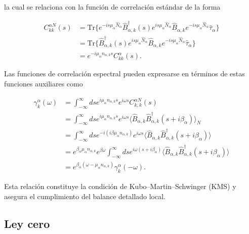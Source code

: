 \begin{appendixs}
la cual se relaciona con la función de correlación estándar de la forma

\begin{align*}
    C^{\alpha N}_{kk}(s) & = \text{Tr}\{e^{-is\mu_{\alpha}\hat{N}_{\alpha} }\hat{B}^{\dagger}_{\alpha,k}(s)e^{is\mu_{\alpha}\hat{N}_{\alpha}} \hat{B}_{\alpha,k}e^{-is\mu_{\alpha}\hat{N}_{\alpha} }\hat{\tau}_{\alpha}   \} \\
 & = \text{Tr}\{\hat{B}^{\dagger}_{\alpha,k}(s)e^{is\mu_{\alpha}\hat{N}_{\alpha}} \hat{B}_{\alpha,k}e^{-is\mu_{\alpha}\hat{N}_{\alpha}}\hat{\tau}_{\alpha}   \}\\
 & = e^{-i\mu_{\alpha}n_{\alpha,k}s} C^{\alpha}_{kk}(s).
\end{align*}

Las funciones de correlación espectral pueden expresarse en términos de estas funciones auxiliares como

\begin{align*}
    \gamma^{\alpha}_{k}(\omega) & = \int_{-\infty}^{\infty}ds e^{i\mu_{\alpha}n_{\alpha,k}s} e^{i\omega s}C^{\alpha N}_{k,k}(s) \\
    & = \int_{-\infty}^{\infty}ds e^{i\mu_{\alpha}n_{\alpha,k}s} e^{i\omega s}\langle \hat{B}_{\alpha,k} \hat{B}^{\dagger}_{\alpha,k}(s+i\beta_{\alpha}) \rangle_{N} \\
    & = \int_{-\infty}^{\infty}ds e^{-i(i\beta \mu_{\alpha}n_{\alpha,k})} e^{i\omega s} \langle \hat{B}_{\alpha,k}\hat{B}^{\dagger}_{\alpha,k}(s+i\beta_{\alpha}) \rangle \\
    & = e^{\beta_{\alpha}\mu_{\alpha}n_{\alpha,k}}e^{\beta \omega} \int_{-\infty}^{\infty} ds e^{i\omega(s+i\beta_{\alpha})} \langle \hat{B}_{\alpha,k}\hat{B}^{\dagger}_{\alpha,k}(s+i\beta_{\alpha}) \rangle \\
    & = e^{\beta_{\alpha}(\omega - \mu_{\alpha}n_{\alpha,k})} \gamma^{\alpha}_{k}(-\omega).
\end{align*}

Esta relación constituye la condición de Kubo–Martin–Schwinger (KMS) y asegura el cumplimiento del balance detallado local.

\label{apendixKMS}





\subsection{Ley cero}


\end{appendixs}

